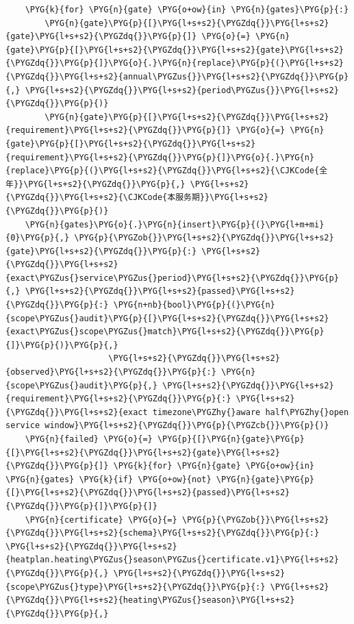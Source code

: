 \begin{Verbatim}
    \PYG{k}{for} \PYG{n}{gate} \PYG{o+ow}{in} \PYG{n}{gates}\PYG{p}{:}
        \PYG{n}{gate}\PYG{p}{[}\PYG{l+s+s2}{\PYGZdq{}}\PYG{l+s+s2}{gate}\PYG{l+s+s2}{\PYGZdq{}}\PYG{p}{]} \PYG{o}{=} \PYG{n}{gate}\PYG{p}{[}\PYG{l+s+s2}{\PYGZdq{}}\PYG{l+s+s2}{gate}\PYG{l+s+s2}{\PYGZdq{}}\PYG{p}{]}\PYG{o}{.}\PYG{n}{replace}\PYG{p}{(}\PYG{l+s+s2}{\PYGZdq{}}\PYG{l+s+s2}{annual\PYGZus{}}\PYG{l+s+s2}{\PYGZdq{}}\PYG{p}{,} \PYG{l+s+s2}{\PYGZdq{}}\PYG{l+s+s2}{period\PYGZus{}}\PYG{l+s+s2}{\PYGZdq{}}\PYG{p}{)}
        \PYG{n}{gate}\PYG{p}{[}\PYG{l+s+s2}{\PYGZdq{}}\PYG{l+s+s2}{requirement}\PYG{l+s+s2}{\PYGZdq{}}\PYG{p}{]} \PYG{o}{=} \PYG{n}{gate}\PYG{p}{[}\PYG{l+s+s2}{\PYGZdq{}}\PYG{l+s+s2}{requirement}\PYG{l+s+s2}{\PYGZdq{}}\PYG{p}{]}\PYG{o}{.}\PYG{n}{replace}\PYG{p}{(}\PYG{l+s+s2}{\PYGZdq{}}\PYG{l+s+s2}{\CJKCode{全年}}\PYG{l+s+s2}{\PYGZdq{}}\PYG{p}{,} \PYG{l+s+s2}{\PYGZdq{}}\PYG{l+s+s2}{\CJKCode{本服务期}}\PYG{l+s+s2}{\PYGZdq{}}\PYG{p}{)}
    \PYG{n}{gates}\PYG{o}{.}\PYG{n}{insert}\PYG{p}{(}\PYG{l+m+mi}{0}\PYG{p}{,} \PYG{p}{\PYGZob{}}\PYG{l+s+s2}{\PYGZdq{}}\PYG{l+s+s2}{gate}\PYG{l+s+s2}{\PYGZdq{}}\PYG{p}{:} \PYG{l+s+s2}{\PYGZdq{}}\PYG{l+s+s2}{exact\PYGZus{}service\PYGZus{}period}\PYG{l+s+s2}{\PYGZdq{}}\PYG{p}{,} \PYG{l+s+s2}{\PYGZdq{}}\PYG{l+s+s2}{passed}\PYG{l+s+s2}{\PYGZdq{}}\PYG{p}{:} \PYG{n+nb}{bool}\PYG{p}{(}\PYG{n}{scope\PYGZus{}audit}\PYG{p}{[}\PYG{l+s+s2}{\PYGZdq{}}\PYG{l+s+s2}{exact\PYGZus{}scope\PYGZus{}match}\PYG{l+s+s2}{\PYGZdq{}}\PYG{p}{]}\PYG{p}{)}\PYG{p}{,}
                     \PYG{l+s+s2}{\PYGZdq{}}\PYG{l+s+s2}{observed}\PYG{l+s+s2}{\PYGZdq{}}\PYG{p}{:} \PYG{n}{scope\PYGZus{}audit}\PYG{p}{,} \PYG{l+s+s2}{\PYGZdq{}}\PYG{l+s+s2}{requirement}\PYG{l+s+s2}{\PYGZdq{}}\PYG{p}{:} \PYG{l+s+s2}{\PYGZdq{}}\PYG{l+s+s2}{exact timezone\PYGZhy{}aware half\PYGZhy{}open service window}\PYG{l+s+s2}{\PYGZdq{}}\PYG{p}{\PYGZcb{}}\PYG{p}{)}
    \PYG{n}{failed} \PYG{o}{=} \PYG{p}{[}\PYG{n}{gate}\PYG{p}{[}\PYG{l+s+s2}{\PYGZdq{}}\PYG{l+s+s2}{gate}\PYG{l+s+s2}{\PYGZdq{}}\PYG{p}{]} \PYG{k}{for} \PYG{n}{gate} \PYG{o+ow}{in} \PYG{n}{gates} \PYG{k}{if} \PYG{o+ow}{not} \PYG{n}{gate}\PYG{p}{[}\PYG{l+s+s2}{\PYGZdq{}}\PYG{l+s+s2}{passed}\PYG{l+s+s2}{\PYGZdq{}}\PYG{p}{]}\PYG{p}{]}
    \PYG{n}{certificate} \PYG{o}{=} \PYG{p}{\PYGZob{}}\PYG{l+s+s2}{\PYGZdq{}}\PYG{l+s+s2}{schema}\PYG{l+s+s2}{\PYGZdq{}}\PYG{p}{:} \PYG{l+s+s2}{\PYGZdq{}}\PYG{l+s+s2}{heatplan.heating\PYGZus{}season\PYGZus{}certificate.v1}\PYG{l+s+s2}{\PYGZdq{}}\PYG{p}{,} \PYG{l+s+s2}{\PYGZdq{}}\PYG{l+s+s2}{scope\PYGZus{}type}\PYG{l+s+s2}{\PYGZdq{}}\PYG{p}{:} \PYG{l+s+s2}{\PYGZdq{}}\PYG{l+s+s2}{heating\PYGZus{}season}\PYG{l+s+s2}{\PYGZdq{}}\PYG{p}{,}

\end{Verbatim}
